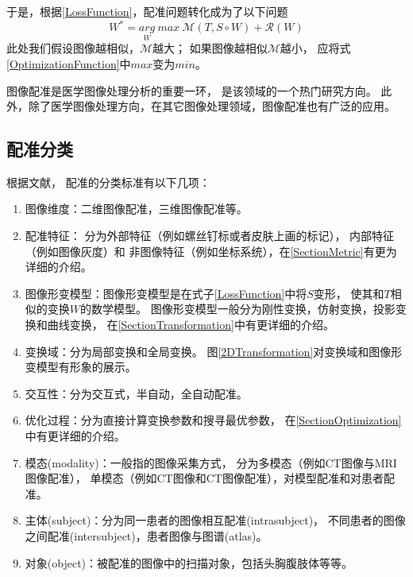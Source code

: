 于是，根据\ref{LossFunction}，配准问题转化成为了以下问题
\begin{equation}\label{OptimizationFunction}
  W^\ast=\underset{W}{arg} \ max \ \mathcal{M}(T,S\circ W)+\mathcal{R}(W)
\end{equation}
此处我们假设图像越相似，$\mathcal{M}$越大；
如果图像越相似$\mathcal{M}$越小，
应将式\ref{OptimizationFunction}中$max$变为$min$。


图像配准是医学图像处理分析的重要一环，
是该领域的一个热门研究方向。
此外，除了医学图像处理方向，在其它图像处理领域，图像配准也有广泛的应用。

\subsection{配准分类}\label{RegistrationClassification}
根据文献\cite{RegistrationSurvey,RegistrationSurveyNew}，
配准的分类标准有以下几项：
\begin{enumerate}
  \item 图像维度：二维图像配准，三维图像配准等。
  \item 配准特征：
    分为外部特征（例如螺丝钉标或者皮肤上画的标记），
    内部特征（例如图像灰度）和
    非图像特征（例如坐标系统），在\ref{SectionMetric}有更为详细的介绍。
  \item 图像形变模型：图像形变模型是在式子\ref{LossFunction}中将$S$变形，
    使其和$T$相似的变换$W$的数学模型。
    图像形变模型一般分为刚性变换，仿射变换，投影变换和曲线变换，
    在\ref{SectionTransformation}中有更详细的介绍。
  \item 变换域：分为局部变换和全局变换。
    图\ref{2DTransformation}对变换域和图像形变模型有形象的展示。
  \item 交互性：分为交互式，半自动，全自动配准。
  \item 优化过程：分为直接计算变换参数和搜寻最优参数，
    在\ref{SectionOptimization}中有更详细的介绍。
  \item 模态(modality)：一般指的图像采集方式，
    分为多模态（例如CT图像与MRI图像配准），
    单模态（例如CT图像和CT图像配准），对模型配准和对患者配准。
  \item 主体(subject)：分为同一患者的图像相互配准(intrasubject)，
    不同患者的图像之间配准(intersubject)，患者图像与图谱(atlas)。
  \item 对象(object)：被配准的图像中的扫描对象，包括头胸腹肢体等等。
\end{enumerate}

